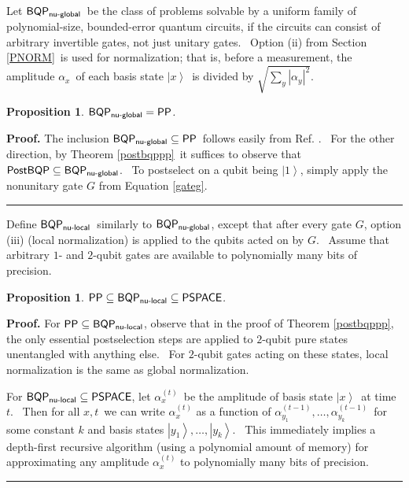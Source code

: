 \documentclass{article}%
\newtheorem{proposition}[theorem]{Proposition}
\newenvironment{proof}[1][Proof]{\noindent\textbf{#1.} }{\ \rule{0.5em}{0.5em}}
\begin{document}
Let $\mathsf{BQP}_{\text{\textsf{nu-global}}}$\ be the class of problems
solvable by a uniform family of polynomial-size, bounded-error quantum
circuits, if the circuits can consist of arbitrary invertible gates, not just
unitary gates. \ Option (ii) from Section \ref{PNORM}\ is used for
normalization; that is, before a measurement, the amplitude $\alpha_{x}$\ of
each basis state $\left\vert x\right\rangle $\ is divided by $\sqrt{\sum
_{y}\left\vert \alpha_{y}\right\vert ^{2}}$.

\begin{proposition}
\label{nuglobal}$\mathsf{BQP}_{\text{\textsf{nu-global}}}=\mathsf{PP}$.
\end{proposition}

\begin{proof}
The inclusion $\mathsf{BQP}_{\text{\textsf{nu-global}}}\subseteq\mathsf{PP}%
$\ follows easily from Ref. \cite{adh}. \ For the other direction, by Theorem
\ref{postbqppp}\ it suffices to observe that $\mathsf{PostBQP}\subseteq
\mathsf{BQP}_{\text{\textsf{nu-global}}}$. \ To postselect on a qubit being
$\left\vert 1\right\rangle $, simply apply the nonunitary gate $G$ from
Equation \ref{gateg}.
\end{proof}

Define $\mathsf{BQP}_{\text{\textsf{nu-local}}}$\ similarly to $\mathsf{BQP}%
_{\text{\textsf{nu-global}}}$, except that after every gate $G$, option (iii)
(local normalization) is applied to the qubits acted on by $G$. \ Assume that
arbitrary $1$- and $2$-qubit gates are available to polynomially many bits of precision.

\begin{proposition}
\label{nulocal}$\mathsf{PP}\subseteq\mathsf{BQP}_{\text{\textsf{nu-local}}%
}\subseteq\mathsf{PSPACE}$.
\end{proposition}

\begin{proof}
For $\mathsf{PP}\subseteq\mathsf{BQP}_{\text{\textsf{nu-local}}}$, observe
that in the proof of Theorem \ref{postbqppp}, the only essential postselection
steps are applied to $2$-qubit pure states unentangled with anything else.
\ For $2$-qubit gates acting on these states, local normalization is the same
as global normalization.

For $\mathsf{BQP}_{\text{\textsf{nu-local}}}\subseteq\mathsf{PSPACE}$, let
$\alpha_{x}^{\left(  t\right)  }$\ be the amplitude of basis state $\left\vert
x\right\rangle $\ at time $t$. \ Then for all $x,t$\ we can write $\alpha
_{x}^{\left(  t\right)  }$ as a function of $\alpha_{y_{1}}^{\left(
t-1\right)  },\ldots,\alpha_{y_{k}}^{\left(  t-1\right)  }$\ for some constant
$k$ and basis states $\left\vert y_{1}\right\rangle ,\ldots,\left\vert
y_{k}\right\rangle $. \ This immediately implies a depth-first recursive
algorithm (using a polynomial amount of memory) for approximating any
amplitude $\alpha_{x}^{\left(  t\right)  }$ to polynomially many bits of precision.
\end{proof}
\end{document}
